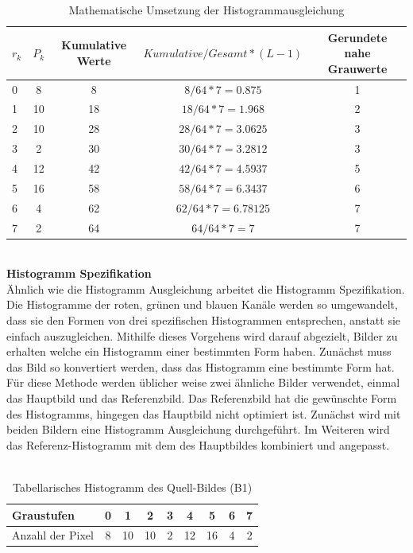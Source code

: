 \documentclass[a4paper,12pt,oneside]{article}
\begin{document}
  \begin{table}
  [h]
  \caption{Mathematische Umsetzung der Histogrammausgleichung}
  \centering
  \begin{tabular}{|l|c|c|c|c|}
  \hline
  $r_{k}$ & $P_{k}$ & Kumulative Werte & $Kumulative/Gesamt*(L-1)$ & Gerundete nahe Grauwerte\\
  \hline
  0 & 8 & 8 & $8/64*7=0.875$ & 1\\
  \hline
  1 & 10 & 18 & $18/64*7=1.968$ & 2\\
  \hline
  2 & 10 & 28 & $28/64*7=3.0625$ & 3\\
  \hline
  3 & 2 & 30 & $30/64*7=3.2812$ & 3\\
  \hline
  4 & 12 & 42 & $42/64*7=4.5937$ & 5\\
  \hline
  5 & 16 & 58 & $58/64*7=6.3437$ & 6\\
  \hline
  6 & 4 & 62 & $62/64*7=6.78125$ & 7\\
  \hline
  7 & 2 & 64 & $64/64*7=7$ & 7\\
  \hline
  \end{tabular}
  \end{table}\\
  \textbf{Histogramm Spezifikation}\label{s.hs}\\
  Ähnlich wie die Histogramm Ausgleichung arbeitet die Histogramm Spezifikation. Die Histogramme der roten, grünen und blauen Kanäle werden so umgewandelt, dass sie den Formen von drei spezifischen Histogrammen entsprechen, anstatt sie einfach auszugleichen. Mithilfe dieses Vorgehens wird darauf abgezielt, Bilder zu erhalten welche ein Histogramm einer bestimmten Form haben. Zunächst muss das Bild so konvertiert werden, dass das Histogramm eine bestimmte Form hat.
  Für diese Methode werden üblicher weise zwei ähnliche Bilder verwendet, einmal das Hauptbild und das Referenzbild. Das Referenzbild hat die gewünschte Form des Histogramms, hingegen das Hauptbild nicht optimiert ist. Zunächst wird mit beiden Bildern eine Histogramm Ausgleichung durchgeführt. Im Weiteren wird das Referenz-Histogramm mit dem des Hauptbildes kombiniert und angepasst.\\\\
  \begin{table}
  [h]
  \caption{Tabellarisches Histogramm des Quell-Bildes (B1)}
  \centering
  \begin{tabular}{|l|c|c|c|c|c|c|c|c|}
  \hline
  Graustufen & 0 & 1 & 2 & 3 & 4 & 5 & 6 & 7\\
  \hline
  Anzahl der Pixel & 8 & 10 & 10 & 2 & 12 & 16 & 4 & 2\\
  \hline
  \end{tabular}
  \end{table}\\
\end{document}
